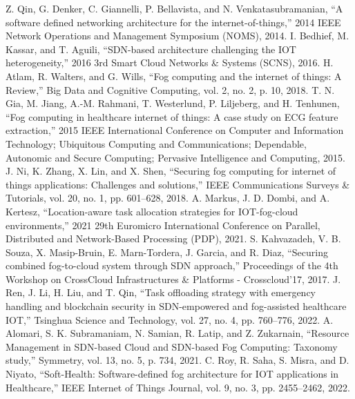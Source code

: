 \documentclass[conference]{IEEEtran}
\begin{document}
\begin{thebibliography}{00}
Z. Qin, G. Denker, C. Giannelli, P. Bellavista, and N. Venkatasubramanian, “A software defined networking architecture for the internet-of-things,” 2014 IEEE Network Operations and Management Symposium (NOMS), 2014. 
I. Bedhief, M. Kassar, and T. Aguili, “SDN-based architecture challenging the IOT heterogeneity,” 2016 3rd Smart Cloud Networks \& Systems (SCNS), 2016. 
H. Atlam, R. Walters, and G. Wills, “Fog computing and the internet of things: A Review,” Big Data and Cognitive Computing, vol. 2, no. 2, p. 10, 2018. 
T. N. Gia, M. Jiang, A.-M. Rahmani, T. Westerlund, P. Liljeberg, and H. Tenhunen, “Fog computing in healthcare internet of things: A case study on ECG feature extraction,” 2015 IEEE International Conference on Computer and Information Technology; Ubiquitous Computing and Communications; Dependable, Autonomic and Secure Computing; Pervasive Intelligence and Computing, 2015. 
J. Ni, K. Zhang, X. Lin, and X. Shen, “Securing fog computing for internet of things applications: Challenges and solutions,” IEEE Communications Surveys \& Tutorials, vol. 20, no. 1, pp. 601–628, 2018. 
A. Markus, J. D. Dombi, and A. Kertesz, “Location-aware task allocation strategies for IOT-fog-cloud environments,” 2021 29th Euromicro International Conference on Parallel, Distributed and Network-Based Processing (PDP), 2021. 
S. Kahvazadeh, V. B. Souza, X. Masip-Bruin, E. Marn-Tordera, J. Garcia, and R. Diaz, “Securing combined fog-to-cloud system through SDN approach,” Proceedings of the 4th Workshop on CrossCloud Infrastructures \& Platforms - Crosscloud'17, 2017. 
J. Ren, J. Li, H. Liu, and T. Qin, “Task offloading strategy with emergency handling and blockchain security in SDN-empowered and fog-assisted healthcare IOT,” Tsinghua Science and Technology, vol. 27, no. 4, pp. 760–776, 2022.
A. Alomari, S. K. Subramaniam, N. Samian, R. Latip, and Z. Zukarnain, “Resource Management in SDN-based Cloud and SDN-based Fog Computing: Taxonomy study,” Symmetry, vol. 13, no. 5, p. 734, 2021.
C. Roy, R. Saha, S. Misra, and D. Niyato, “Soft-Health: Software-defined fog architecture for IOT applications in Healthcare,” IEEE Internet of Things Journal, vol. 9, no. 3, pp. 2455–2462, 2022.



\end{thebibliography}
\vspace{12pt}
\end{document}
